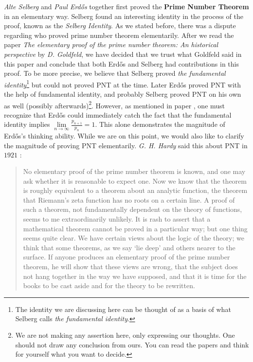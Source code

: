 \documentclass{subfile}
\begin{document}
	\textit{Alte Selberg} and \textit{Paul Erd\H os} together first proved the \textbf{Prime Number Theorem} in an elementary way. Selberg found an interesting identity in the process of the proof, known as the \textit{Selberg Identity}. As we stated before, there was a dispute regarding who proved prime number theorem elementarily. After we read the paper \textit{The elementary proof of the prime number theorem: An historical perspective} \cite{dispute} by \textit{D. Goldfeld}, we have decided that we trust what Goldfeld said in this paper and conclude that both Erd\H os and Selberg had contributions in this proof. To be more precise, we believe that Selberg proved \textit{the fundamental identity}\footnote{The identity we are discussing here can be thought of as a basis of what Selberg calls \textit{the fundamental identity}.} but could not proved PNT at the time. Later Erd\H os proved PNT with the help of fundamental identity, and probably Selberg proved PNT on his own as well (possibly afterwards)\footnote{We are not making any assertion here, only expressing our thoughts. One should not draw any conclusion from ours. You can read the papers and think for yourself what you want to decide.}. However, as mentioned in paper \cite{dispute}, one must recognize that Erd\H os could immediately catch the fact that the fundamental identity implies $\lim\limits_{n\to\infty}\frac{p_{n+1}}{p_n}=1$. This alone demonstrates the magnitude of Erd\H os's thinking ability. While we are on this point, we would also like to clarify the magnitude of proving PNT elementarily. \textit{G. H. Hardy} said this about PNT in $1921$ \cite{hardy}:
		\begin{quote}
			No elementary proof of the prime number theorem is known, and one may
			ask whether it is reasonable to expect one. Now we know that the theorem
			is roughly equivalent to a theorem about an analytic function, the theorem
			that Riemann's zeta function has no roots on a certain line. A proof of such
			a theorem, not fundamentally dependent on the theory of functions, seems to
			me extraordinarily unlikely. It is rash to assert that a mathematical theorem
			cannot be proved in a particular way; but one thing seems quite clear. We have
			certain views about the logic of the theory; we think that some theorems, as we
			say `lie deep' and others nearer to the surface. If anyone produces an elementary
			proof of the prime number theorem, he will show that these views are wrong,
			that the subject does not hang together in the way we have supposed, and that
			it is time for the books to be cast aside and for the theory to be rewritten.
		\end{quote}
	
\end{document}
